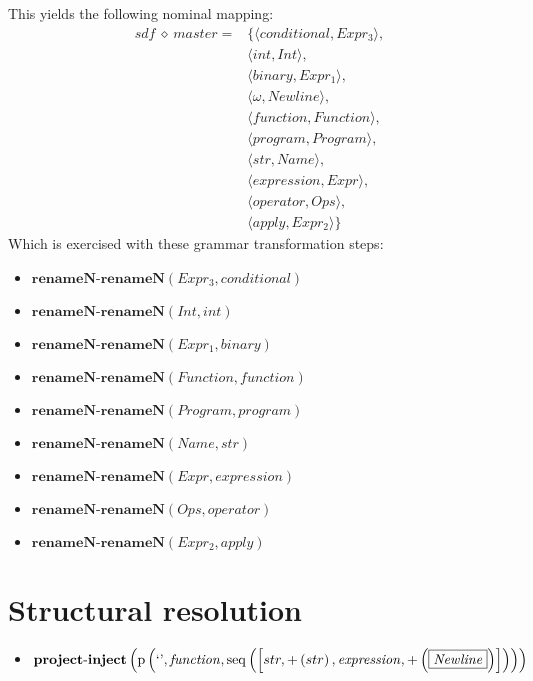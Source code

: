 This yields the following nominal mapping:
\begin{align*}\mathit{sdf} \:\diamond\: \mathit{master} =& \{\langle \mathit{conditional},\mathit{Expr_3}\rangle,\\
 & \langle int,\mathit{Int}\rangle,\\
 & \langle \mathit{binary},\mathit{Expr_1}\rangle,\\
 & \langle \omega,\mathit{Newline}\rangle,\\
 & \langle \mathit{function},\mathit{Function}\rangle,\\
 & \langle \mathit{program},\mathit{Program}\rangle,\\
 & \langle str,\mathit{Name}\rangle,\\
 & \langle \mathit{expression},\mathit{Expr}\rangle,\\
 & \langle \mathit{operator},\mathit{Ops}\rangle,\\
 & \langle \mathit{apply},\mathit{Expr_2}\rangle\}\end{align*}
 Which is exercised with these grammar transformation steps:

{\footnotesize\begin{itemize}
\item $\mathbf{renameN\text{-}renameN}\left(\mathit{Expr_3},\mathit{conditional}\right)$
\item $\mathbf{renameN\text{-}renameN}\left(\mathit{Int},int\right)$
\item $\mathbf{renameN\text{-}renameN}\left(\mathit{Expr_1},\mathit{binary}\right)$
\item $\mathbf{renameN\text{-}renameN}\left(\mathit{Function},\mathit{function}\right)$
\item $\mathbf{renameN\text{-}renameN}\left(\mathit{Program},\mathit{program}\right)$
\item $\mathbf{renameN\text{-}renameN}\left(\mathit{Name},str\right)$
\item $\mathbf{renameN\text{-}renameN}\left(\mathit{Expr},\mathit{expression}\right)$
\item $\mathbf{renameN\text{-}renameN}\left(\mathit{Ops},\mathit{operator}\right)$
\item $\mathbf{renameN\text{-}renameN}\left(\mathit{Expr_2},\mathit{apply}\right)$
\end{itemize}}

\section{Structural resolution}
{\footnotesize\begin{itemize}
\item $\mathbf{project\text{-}inject}\\\left(\mathrm{p}\left(\text{`'},\mathit{function},\mathrm{seq}\left(\left[str, {+}\left(str\right), \mathit{expression}, {+}\left(\fbox{$\mathit{Newline}$}\right)\right]\right)\right)\right)$
\end{itemize}}
